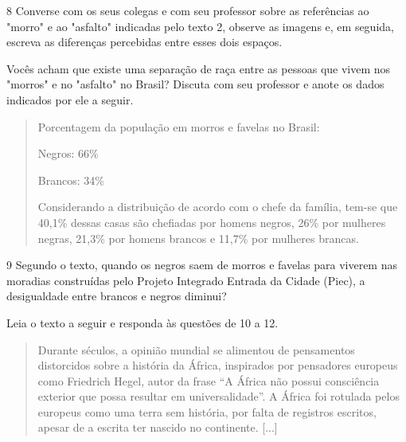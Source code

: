 \begin{itemize}
\begin{itemize}
\begin{itemize}
\num{8} Converse com os seus colegas e com seu professor sobre as referências ao
"morro" e ao "asfalto" indicadas pelo texto 2, observe as imagens e, em
seguida, escreva as diferenças percebidas entre esses dois espaços.


Vocês acham que existe uma separação de raça entre as pessoas que vivem
nos "morros" e no "asfalto" no Brasil? Discuta com seu professor e anote
os dados indicados por ele a seguir.

\begin{quote}
Porcentagem da população em morros e favelas no Brasil:

Negros: 66\%

Brancos: 34\%

Considerando a distribuição de acordo com o chefe da família, tem-se que
40,1\% dessas casas são chefiadas por homens negros, 26\% por mulheres
negras, 21,3\% por homens brancos e 11,7\% por mulheres brancas.
\end{quote}

\num{9} Segundo o texto, quando os negros saem de morros e favelas para viverem nas
moradias construídas pelo Projeto Integrado Entrada da Cidade (Piec), a
desigualdade entre brancos e negros diminui?


Leia o texto a seguir e responda às questões de 10 a 12.


\begin{quote}
Durante séculos, a opinião mundial se alimentou de pensamentos
distorcidos sobre a história da África, inspirados por pensadores
europeus como Friedrich Hegel, autor da frase ``A África não possui
consciência exterior que possa resultar em universalidade''. A África
foi rotulada pelos europeus como uma terra sem história, por falta de
registros escritos, apesar de a escrita ter nascido no continente. [...]


\end{quote}
\end{itemize}
\end{itemize}
\end{itemize}
